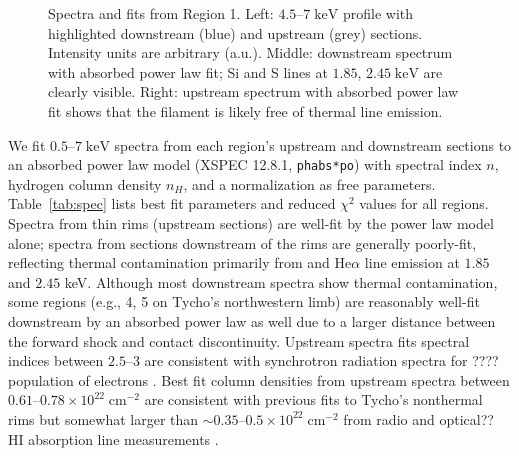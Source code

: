 \documentclass[iop, apj, numberedappendix, twocolappendix]{emulateapj}
\newcommand*{\mt}{\mathrm}
\newcommand*{\unit}[1]{\;\mt{#1}}  %
\newcommand*{\abt}{\mathord{\sim}} %
\begin{document}
\begin{figure*}
    \caption{Spectra and fits from Region 1. Left: $4.5$--$7 \unit{keV}$
    profile with highlighted downstream (blue) and upstream (grey) sections.
    Intensity units are arbitrary (a.u.).  Middle: downstream spectrum with
    absorbed power law fit; Si and S lines at $1.85$, $2.45 \unit{keV}$ are
    clearly visible.  Right: upstream spectrum with absorbed power law fit
    shows that the filament is likely free of thermal line emission.}
    \label{fig:spec}
\end{figure*}

We fit $0.5$--$7 \unit{keV}$ spectra from each region's upstream and downstream
sections to an absorbed power law model (XSPEC 12.8.1, \texttt{phabs*po}) with
spectral index $n$, hydrogen column density $n_H$, and a normalization as free
parameters.  Table~\ref{tab:spec} lists best fit parameters and reduced
$\chi^2$ values for all regions.  Spectra from thin rims (upstream sections)
are well-fit by the power law model alone; spectra from sections downstream of
the rims are generally poorly-fit, reflecting thermal contamination primarily
from  and  He$\alpha$ line emission at $1.85$ and $2.45$
keV.  Although most downstream spectra show thermal contamination, some regions
(e.g., 4, 5 on Tycho's northwestern limb) are reasonably well-fit downstream by
an absorbed power law as well due to a larger distance between the forward
shock and contact discontinuity.
Upstream spectra fits spectral indices between $2.5$--$3$ are consistent with
synchrotron radiation spectra for ???? population of electrons
. Best fit column densities from
upstream spectra between $0.61$--$0.78 \times 10^{22} \unit{cm^{-2}}$ are
consistent with previous fits to Tycho's nonthermal rims \citep{hwang2002} but
somewhat larger than $\abt0.35$--$0.5 \times 10^{22} \unit{cm^{-2}}$ from radio
and optical??  HI absorption line measurements \citep{black1984, albinson1986,
kothes2004}.

\end{document}
